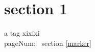 \documentclass[12pt]{article}
\begin{document}
    \section{section 1}
        a tag \label{marker}
        xixixi \\
        pageNum: \pageref{marker} \ section \ref{marker}
\end{document}
